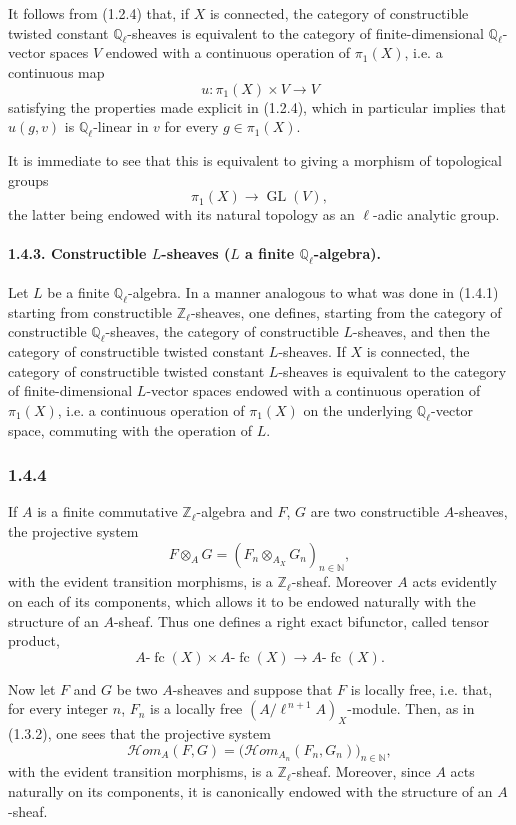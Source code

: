 \documentclass[11pt]{article}
\providecommand{\GL}{\operatorname{GL}}
\providecommand{\cHom}{\mathcal{H}om}
\providecommand{\fc}{\operatorname{fc}}
\begin{document}
It follows from (1.2.4) that, if \(X\) is connected, the category of constructible twisted constant \(\mathbb Q_\ell\)-sheaves is equivalent to the category of finite-dimensional \(\mathbb Q_\ell\)-vector spaces \(V\) endowed with a continuous operation of \(\pi_1(X)\), i.e. a continuous map
\[
u:\pi_1(X)\times V\longrightarrow V
\]
satisfying the properties made explicit in (1.2.4), which in particular implies that \(u(g,v)\) is \(\mathbb Q_\ell\)-linear in \(v\) for every \(g\in\pi_1(X)\).

It is immediate to see that this is equivalent to giving a morphism of topological groups
\[
\pi_1(X)\longrightarrow \GL(V),
\]
the latter being endowed with its natural topology as an \(\ell\)-adic analytic group.

\paragraph{1.4.3. Constructible \(L\)-sheaves (\(L\) a finite \(\mathbb Q_\ell\)-algebra).}
Let \(L\) be a finite \(\mathbb Q_\ell\)-algebra. In a manner analogous to what was done in (1.4.1) starting from constructible \(\mathbb Z_\ell\)-sheaves, one defines, starting from the category of constructible \(\mathbb Q_\ell\)-sheaves, the category of constructible \(L\)-sheaves, and then the category of constructible twisted constant \(L\)-sheaves. If \(X\) is connected, the category of constructible twisted constant \(L\)-sheaves is equivalent to the category of finite-dimensional \(L\)-vector spaces endowed with a continuous operation of \(\pi_1(X)\), i.e. a continuous operation of \(\pi_1(X)\) on the underlying \(\mathbb Q_\ell\)-vector space, commuting with the operation of \(L\).

\subsubsection*{1.4.4}
If \(A\) is a finite commutative \(\mathbb Z_\ell\)-algebra and \(F\), \(G\) are two constructible \(A\)-sheaves, the projective system
\[
F\otimes_A G=(F_n\otimes_{A_X} G_n)_{n\in\mathbb N},
\]
with the evident transition morphisms, is a \(\mathbb Z_\ell\)-sheaf. Moreover \(A\) acts evidently on each of its components, which allows it to be endowed naturally with the structure of an \(A\)-sheaf. Thus one defines a right exact bifunctor, called tensor product,
\[
A\text{-}\fc(X)\times A\text{-}\fc(X)\longrightarrow A\text{-}\fc(X).
\]

Now let \(F\) and \(G\) be two \(A\)-sheaves and suppose that \(F\) is locally free, i.e. that, for every integer \(n\), \(F_n\) is a locally free \((A/\ell^{\,n+1}A)_X\)-module. Then, as in (1.3.2), one sees that the projective system
\[
\cHom_A(F,G)=\bigl(\cHom_{A_n}(F_n,G_n)\bigr)_{n\in\mathbb N},
\]
with the evident transition morphisms, is a \(\mathbb Z_\ell\)-sheaf. Moreover, since \(A\) acts naturally on its components, it is canonically endowed with the structure of an \(A\)-sheaf.
\end{document}
